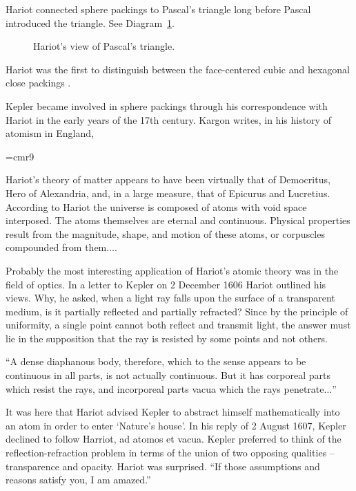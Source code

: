 \smallskip
Hariot connected sphere packings to Pascal's triangle long before
Pascal introduced the triangle. See Diagram~\ref{fig:pascal}.

\begin{figure}[htb]
  \centering
  \caption{Hariot's view of Pascal's triangle.}
  \label{fig:pascal}
\end{figure}

Hariot was the first to distinguish between the face-centered
cubic and hexagonal close packings \cite[p.52]{Mas66}.

Kepler became involved in sphere packings through his correspondence
with Hariot in the early years of the 17th century.
Kargon writes, in his history of atomism in England,


{
\narrower
\font\ninerm=cmr9
\ninerm

    Hariot's theory of matter appears to have been virtually that of Democritus, Hero of Alexandria, and, in a large measure, that of Epicurus
    and Lucretius. According to Hariot the universe is composed of atoms with void space interposed. The atoms themselves are eternal and
    continuous. Physical properties result from the magnitude, shape, and motion of these atoms, or corpuscles compounded from them$\ldots$.

    Probably the most interesting application of Hariot's atomic theory was in the field of optics. In a letter to Kepler on 2 December 1606
    Hariot outlined his views. Why, he asked, when a light ray falls upon the surface of a transparent medium, is it partially reflected and
    partially refracted? Since by the principle of uniformity, a single point cannot both reflect and transmit light, the answer must lie in the
    supposition that the ray is resisted by some points and not others.

    ``A dense diaphanous body, therefore, which to the sense appears to be continuous in all parts, is not actually continuous. But it has
    corporeal parts which resist the rays, and incorporeal parts vacua which the rays penetrate$\ldots$''

    It was here that Hariot advised Kepler to abstract himself mathematically into an atom in order to enter `Nature's house'. In his reply of 2
    August 1607, Kepler declined to follow Harriot, ad atomos et vacua. Kepler preferred to think of the reflection-refraction problem in terms
    of the union of two opposing qualities --
    transparence and opacity. Hariot was surprised. ``If those assumptions and reasons satisfy you, I
    am amazed.'' \cite[p.26]{Kar66}

}

